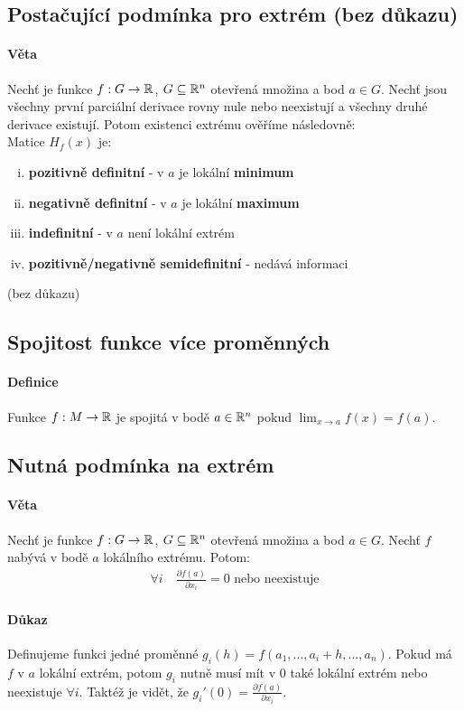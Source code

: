 \documentclass[a4paper,10pt]{article}
\begin{document}
\subsection{Postačující podmínka pro extrém (bez důkazu)}
\setcounter{equation}{0}
\paragraph{Věta}
Nechť je funkce $f: G \to \mathbb{R}$, $G \subseteq \mathbb{R}^n$ otevřená množina a bod $a \in G$.
Nechť jsou všechny první parciální derivace rovny nule nebo neexistují a všechny
druhé derivace existují. Potom existenci extrému ověříme následovně: \\
Matice $H_f(x)$ je:
\begin{enumerate}[i.]
	\item \textbf{pozitivně definitní} - v $a$ je lokální \textbf{minimum}
	\item \textbf{negativně definitní} - v $a$ je lokální \textbf{maximum}
	\item \textbf{indefinitní} - v $a$ není lokální extrém
	\item \textbf{pozitivně/negativně semidefinitní} - nedává informaci
\end{enumerate}
(bez důkazu)

\subsection{Spojitost funkce více proměnných}
\setcounter{equation}{0}
\paragraph{Definice}
Funkce $f: M \to \mathbb{R}$ je spojitá v bodě $a \in \mathbb{R}^n$ pokud $\lim_{x\to a} f(x) = f(a)$.

\subsection{Nutná podmínka na extrém}
\setcounter{equation}{0}
\paragraph{Věta}
Nechť je funkce $f: G\to \mathbb{R}$, $G \subseteq \mathbb{R}^n$ otevřená množina a bod $a \in G$.
Nechť $f$ nabývá v bodě $a$ lokálního extrému. Potom:
\begin{align*}
	\forall i \quad \frac{\partial f(a)}{\partial x_i} = 0 \text{ nebo
	neexistuje}
\end{align*}
\paragraph{Důkaz}
Definujeme funkci jedné proměnné $g_i(h) = f(a_1, ..., a_i+h, ..., a_n)$. Pokud
má $f$ v $a$ lokální extrém, potom $g_i$ nutně musí mít v $0$ také lokální extrém nebo
neexistuje $\forall i$. Taktéž je vidět, že $g_i'(0) = \frac{\partial f(a)}{\partial x_i}$.
\end{document}
